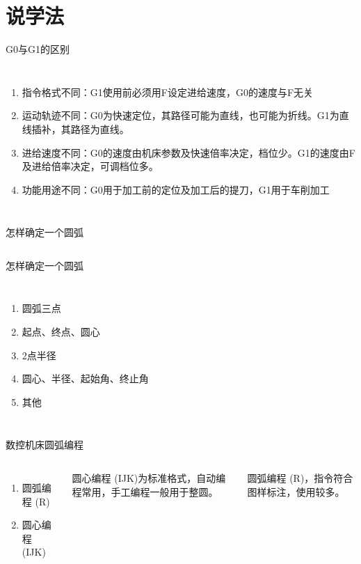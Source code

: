 \documentclass[UTF8,zihao=-4]{ctexbeamer}
\begin{document}
\section{说学法}
\begin{frame}{G0与G1的区别}
    \begin{columns}[onlytextwidth]
        \column{\textwidth}
\begin{enumerate}
    \item 指令格式不同：G1使用前必须用F设定进给速度，G0的速度与F无关 
    \item 运动轨迹不同：G0为快速定位，其路径可能为直线，也可能为折线。G1为直线插补，其路径为直线。
    \item 进给速度不同：G0的速度由机床参数及快速倍率决定，档位少。G1的速度由F及进给倍率决定，可调档位多。
    \item 功能用途不同：G0用于加工前的定位及加工后的提刀，G1用于车削加工
\end{enumerate}
    \end{columns}
\end{frame}


\begin{frame}{怎样确定一个圆弧}
    \begin{columns}
        \column{\textwidth}
    \end{columns}
\end{frame}

\begin{frame}{怎样确定一个圆弧}
    \begin{columns}
        \column{\textwidth}
        \begin{enumerate}
            \item 圆弧三点
            \item 起点、终点、圆心
            \item 2点半径
            \item 圆心、半径、起始角、终止角
            \item 其他
        \end{enumerate}
    \end{columns}
\end{frame}

\begin{frame}{数控机床圆弧编程}
    \begin{columns}
        \begin{enumerate}
            \item 圆弧编程 (R)
            \item 圆心编程 (IJK)
        \end{enumerate}
         \vspace{1cm}
         圆心编程 (IJK)为标准格式，自动编程常用，手工编程一般用于整圆。
         
         圆弧编程 (R)，指令符合图样标注，使用较多。
    \end{columns}
\end{frame}
\end{document}
